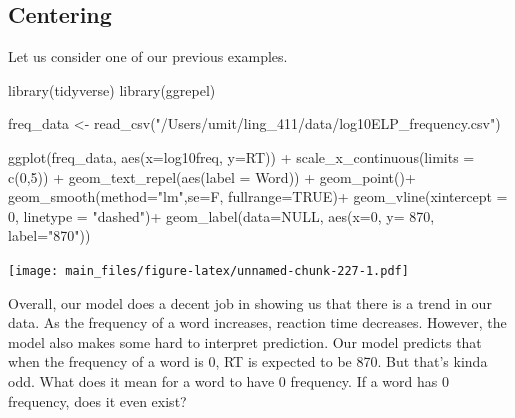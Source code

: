 \documentclass[
]{book}
\newenvironment{Shaded}{\begin{snugshade}}{\end{snugshade}}
\newcommand{\AttributeTok}[1]{\textcolor[rgb]{0.77,0.63,0.00}{#1}}
\newcommand{\ConstantTok}[1]{\textcolor[rgb]{0.00,0.00,0.00}{#1}}
\newcommand{\DecValTok}[1]{\textcolor[rgb]{0.00,0.00,0.81}{#1}}
\newcommand{\FunctionTok}[1]{\textcolor[rgb]{0.00,0.00,0.00}{#1}}
\newcommand{\NormalTok}[1]{#1}
\newcommand{\OtherTok}[1]{\textcolor[rgb]{0.56,0.35,0.01}{#1}}
\newcommand{\SpecialCharTok}[1]{\textcolor[rgb]{0.00,0.00,0.00}{#1}}
\newcommand{\StringTok}[1]{\textcolor[rgb]{0.31,0.60,0.02}{#1}}
\begin{document}
\hypertarget{centering}{%
\subsection{Centering}\label{centering}}

Let us consider one of our previous examples.

\begin{Shaded}
\begin{Highlighting}[]
\FunctionTok{library}\NormalTok{(tidyverse)}
\FunctionTok{library}\NormalTok{(ggrepel)}
\end{Highlighting}
\end{Shaded}

\begin{Shaded}
\begin{Highlighting}[]
\NormalTok{freq\_data }\OtherTok{\textless{}{-}} \FunctionTok{read\_csv}\NormalTok{(}\StringTok{"/Users/umit/ling\_411/data/log10ELP\_frequency.csv"}\NormalTok{)}

\FunctionTok{ggplot}\NormalTok{(freq\_data, }\FunctionTok{aes}\NormalTok{(}\AttributeTok{x=}\NormalTok{log10freq, }\AttributeTok{y=}\NormalTok{RT)) }\SpecialCharTok{+}
  \FunctionTok{scale\_x\_continuous}\NormalTok{(}\AttributeTok{limits =} \FunctionTok{c}\NormalTok{(}\DecValTok{0}\NormalTok{,}\DecValTok{5}\NormalTok{)) }\SpecialCharTok{+}
  \FunctionTok{geom\_text\_repel}\NormalTok{(}\FunctionTok{aes}\NormalTok{(}\AttributeTok{label =}\NormalTok{ Word)) }\SpecialCharTok{+}
  \FunctionTok{geom\_point}\NormalTok{()}\SpecialCharTok{+}
  \FunctionTok{geom\_smooth}\NormalTok{(}\AttributeTok{method=}\StringTok{"lm"}\NormalTok{,}\AttributeTok{se=}\NormalTok{F, }\AttributeTok{fullrange=}\ConstantTok{TRUE}\NormalTok{)}\SpecialCharTok{+}
  \FunctionTok{geom\_vline}\NormalTok{(}\AttributeTok{xintercept =} \DecValTok{0}\NormalTok{, }\AttributeTok{linetype =} \StringTok{"dashed"}\NormalTok{)}\SpecialCharTok{+}
  \FunctionTok{geom\_label}\NormalTok{(}\AttributeTok{data=}\ConstantTok{NULL}\NormalTok{, }\FunctionTok{aes}\NormalTok{(}\AttributeTok{x=}\DecValTok{0}\NormalTok{, }\AttributeTok{y=} \DecValTok{870}\NormalTok{, }\AttributeTok{label=}\StringTok{"870"}\NormalTok{))}
\end{Highlighting}
\end{Shaded}

\texttt{[image: main\_files/figure-latex/unnamed-chunk-227-1.pdf]}

Overall, our model does a decent job in showing us that there is a trend in our data. As the frequency of a word increases, reaction time decreases. However, the model also makes some hard to interpret prediction. Our model predicts that when the frequency of a word is 0, RT is expected to be 870. But that's kinda odd. What does it mean for a word to have 0 frequency. If a word has 0 frequency, does it even exist?
\end{document}
